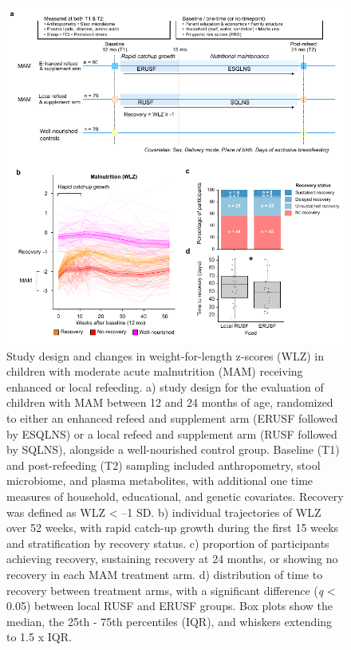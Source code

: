 \documentclass{article}
\begin{document}
\begin{figure}[H]
	\centering
	\includegraphics[scale=1.2]{figures/recovery2}
	\caption[Study design and changes in weight-for-length z-scores (WLZ) in children with moderate acute malnutrition (MAM) receiving enhanced or local refeeding]{
		Study design and changes in weight-for-length z-scores (WLZ) in children with moderate acute malnutrition (MAM) receiving enhanced or local refeeding.
		a) study design for the evaluation of children with MAM between 12 and 24 months of age, randomized to either an enhanced refeed and supplement arm (ERUSF followed by ESQLNS) or a local refeed and supplement arm (RUSF followed by SQLNS), alongside a well-nourished control group. Baseline (T1) and post-refeeding (T2) sampling included anthropometry, stool microbiome, and plasma metabolites, with additional one time measures of household, educational, and genetic covariates. Recovery was defined as WLZ \textless{} –1 SD.
		b) individual trajectories of WLZ over 52 weeks, with rapid catch-up growth during the first 15 weeks and stratification by recovery status.
		c) proportion of participants achieving recovery, sustaining recovery at 24 months, or showing no recovery in each MAM treatment arm.
		d) distribution of time to recovery between treatment arms, with a significant difference (\textit{q} \textless{} 0.05) between local RUSF and ERUSF groups. Box plots show the median, the 25th - 75th percentiles (IQR), and whiskers extending to 1.5 x IQR.
	}
	\label{fig:Figure1}
\end{figure}
\end{document}
